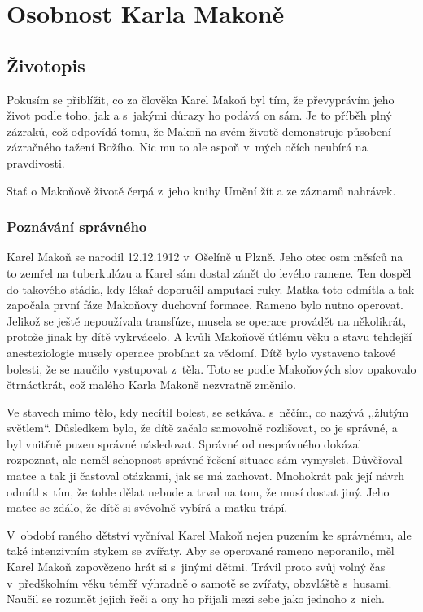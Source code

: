 \chapter{Osobnost Karla Makoně}

\section{Životopis}

Pokusím se přiblížit, co za člověka Karel Makoň byl tím, že převyprávím jeho
život podle toho, jak a s~jakými důrazy ho podává on sám. Je to příběh plný
zázraků, což odpovídá tomu, že Makoň na svém životě demonstruje působení
zázračného tažení Božího. Nic mu to ale aspoň v~mých očích neubírá na
pravdivosti.

Stať o Makoňově životě čerpá z~jeho knihy Umění žít a ze záznamů nahrávek.

\subsection{Poznávání správného}

Karel Makoň se narodil 12.12.1912 v~Ošelíně u Plzně. Jeho otec osm měsíců na
to zemřel na tuberkulózu a Karel sám dostal zánět do levého ramene. Ten dospěl
do takového stádia, kdy lékař doporučil amputaci ruky. Matka toto odmítla a tak
započala první fáze Makoňovy duchovní formace. Rameno bylo nutno operovat.
Jelikož se ještě nepoužívala transfúze, musela se operace provádět na
několikrát, protože jinak by dítě vykrvácelo. A kvůli Makoňově útlému věku a
stavu tehdejší anesteziologie musely operace probíhat za vědomí. Dítě bylo
vystaveno takové bolesti, že se naučilo vystupovat z~těla. Toto se podle
Makoňových slov opakovalo čtrnáctkrát, což malého Karla Makoně nezvratně
změnilo.

Ve stavech mimo tělo, kdy necítil bolest, se setkával s~něčím, co nazývá
,,žlutým světlem``.  Důsledkem bylo, že dítě začalo samovolně rozlišovat, co je
správné, a byl vnitřně puzen správné následovat. Správné od nesprávného dokázal
rozpoznat, ale neměl schopnost správné řešení situace sám vymyslet. Důvěřoval
matce a tak ji častoval otázkami, jak se má zachovat. Mnohokrát pak její návrh
odmítl s~tím, že tohle dělat nebude a trval na tom, že musí dostat jiný. Jeho
matce se zdálo, že dítě si svévolně vybírá a matku trápí.

V~období raného dětství vyčníval Karel Makoň nejen puzením ke správnému, ale
také intenzivním stykem se zvířaty. Aby se operované rameno neporanilo, měl
Karel Makoň zapovězeno hrát si s~jinými dětmi. Trávil proto svůj volný čas
v~předškolním věku téměř výhradně o samotě se zvířaty, obzvláště s~husami.
Naučil se rozumět jejich řeči a ony ho přijali mezi sebe jako jednoho z~nich.

